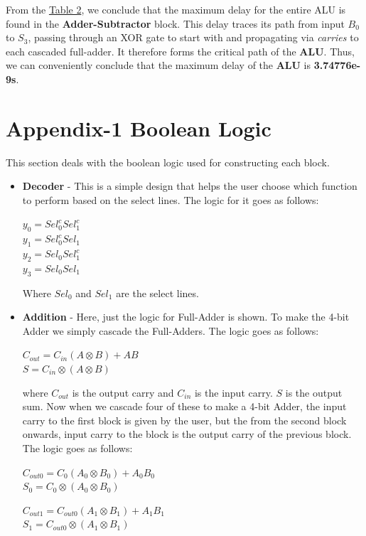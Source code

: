 \documentclass[a4paper, titlepage]{article}
\begin{document}
From the \hyperlink{del_tab}{Table 2}, we conclude that the maximum delay for the entire ALU is found in the \textbf{Adder-Subtractor}
block. This delay traces its path from input $B_0$ to $S_3$, passing through an XOR gate to start with and propagating via \textit{carries}
to each cascaded full-adder. It therefore forms the critical path of the \textbf{ALU}. Thus, we can conveniently conclude that the maximum 
delay of the \textbf{ALU} is \textbf{3.74776e-9s}.

\section{Appendix-1 Boolean Logic}
\label{sec:Appendix}
This section deals with the boolean logic used for constructing each block. 
\begin{itemize}
    \item \textbf{Decoder} - This is a simple design that helps the user choose which function to perform based on the select lines.
    The logic for it goes as follows:
    \begin{center}
        $y_0 = Sel_0^cSel_1^c$\\
        $y_1 = Sel_0^cSel_1$\\
        $y_2 = Sel_0Sel_1^c$\\
        $y_3 = Sel_0Sel_1$
    \end{center}
    Where $Sel_0$ and $Sel_1$ are the select lines.
    \item \textbf{Addition} - Here, just the logic for Full-Adder is shown. To make the 4-bit Adder we simply cascade the 
    Full-Adders. The logic goes as follows:
    \begin{center}
        $C_{out} = C_{in}(A\otimes B) + AB$ \\
        $S = C_{in}\otimes (A\otimes B)$
    \end{center}
    where $C_{out}$ is the output carry and $C_{in}$ is the input carry. $S$ is the output sum.\newline 
    Now when we cascade four of these to make a 4-bit Adder, the input carry to the first block is given by the user, but 
    the from the second block onwards, input carry to the block is the output carry of the previous block. The logic goes
    as follows:
    \begin{center}
        $C_{out0} = C_{0}(A_0\otimes B_0) + A_0B_0$ \\
        $S_0 = C_{0}\otimes (A_0\otimes B_0)$

        $C_{out1} = C_{out0}(A_1\otimes B_1) + A_1B_1$ \\
        $S_1 = C_{out0}\otimes (A_1\otimes B_1)$


\end{center}
\end{itemize}
\end{document}
